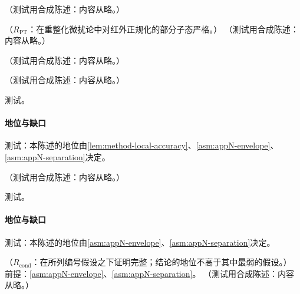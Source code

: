 \begin{definition}\label{def:method-soft-approx}
（测试用合成陈述：内容从略。）
\end{definition}

\begin{lemma}\label{lem:method-i0-compat}
（$R_{\mathrm{PT}}$：在重整化微扰论中对红外正规化的部分子态严格。）
（测试用合成陈述：内容从略。）
\end{lemma}

\begin{lemma}[乘积的伸缩恒等式]\label{lem:method-telescoping}
（测试用合成陈述：内容从略。）
\end{lemma}

\begin{lemma}\label{lem:method-collinear-accuracy}
（测试用合成陈述：内容从略。）
\end{lemma}
\begin{proofsketch}测试。\end{proofsketch}
\paragraph{地位与缺口}测试：本陈述的地位由\cref{lem:method-local-accuracy}、\cref{asm:appN-envelope}、\cref{asm:appN-separation}决定。

\begin{lemma}\label{lem:method-soft-accuracy}
（测试用合成陈述：内容从略。）
\end{lemma}
\begin{proofsketch}测试。\end{proofsketch}
\paragraph{地位与缺口}测试：本陈述的地位由\cref{asm:appN-envelope}、\cref{asm:appN-separation}决定。

\begin{lemma}\label{lem:method-local-accuracy}
（$R_{\mathrm{cond}}$：在所列编号假设之下证明完整；结论的地位不高于其中最弱的假设。）
前提：\cref{asm:appN-envelope}、\cref{asm:appN-separation}。
（测试用合成陈述：内容从略。）
\end{lemma}

